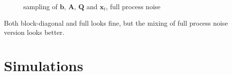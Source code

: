 \documentclass[]{article}
\begin{document}
\begin{figure}[h!]
	\caption{sampling of $\mathbf{b}$, $\mathbf{A}$, $\mathbf{Q}$ and $\mathbf{x}_t$, full process noise}
	\label{bAQX_full}
\end{figure}

Both block-diagonal and full looks fine, but the mixing of  full process noise version looks better.


\section{Simulations}
\end{document}
